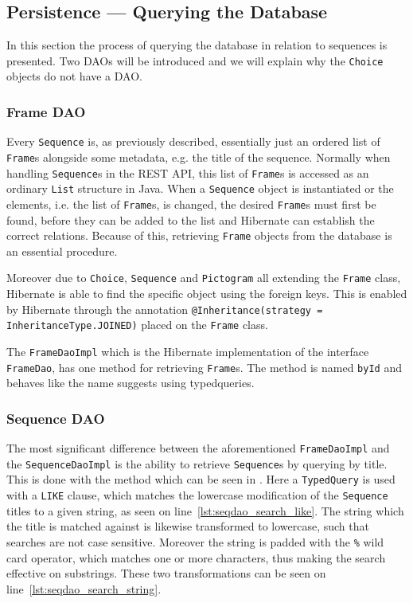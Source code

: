 \subsection{Persistence --- Querying the Database}
In this section the process of querying the database in relation to sequences is presented.
Two DAOs will be introduced and we will explain why the \texttt{Choice} objects do not have a DAO.

\subsubsection{Frame DAO}
Every \texttt{Sequence} is, as previously described, essentially just an ordered list of \texttt{Frame}s alongside some metadata, e.g. the title of the sequence.
Normally when handling \texttt{Sequence}s in the REST API, this list of \texttt{Frame}s is accessed as an ordinary \texttt{List} structure in Java.
When a \texttt{Sequence} object is instantiated or the elements, i.e. the list of \texttt{Frame}s, is changed, the desired \texttt{Frame}s must first be found, before they can be added to the list and Hibernate can establish the correct relations.
Because of this, retrieving \texttt{Frame} objects from the database is an essential procedure.

Moreover due to \texttt{Choice}, \texttt{Sequence} and \texttt{Pictogram} all extending the \texttt{Frame} class, Hibernate is able to find the specific object using the foreign keys.
This is enabled by Hibernate through the annotation \texttt{@Inheritance(strategy = InheritanceType.JOINED)} placed on the \texttt{Frame} class.

\bigskip
The \texttt{FrameDaoImpl} which is the Hibernate implementation of the interface \texttt{FrameDao}, has one method for retrieving \texttt{Frame}s.
The method is named \texttt{byId} and behaves like the name suggests using typedqueries.

\subsubsection{Sequence DAO}
The most significant difference between the aforementioned \texttt{FrameDaoImpl} and the \texttt{SequenceDaoImpl} is the ability to retrieve \texttt{Sequence}s by querying by title.
This is done with the method which can be seen in .
Here a \texttt{TypedQuery} is used with a \texttt{LIKE} clause, which matches the lowercase modification of the \texttt{Sequence} titles to a given string, as seen on line~\ref{lst:seqdao_search_like}.
The string which the title is matched against is likewise transformed to lowercase, such that searches are not case sensitive.
Moreover the string is padded with the \texttt{\%} wild card operator, which matches one or more characters, thus making the search effective on substrings.
These two transformations can be seen on line~\ref{lst:seqdao_search_string}.

